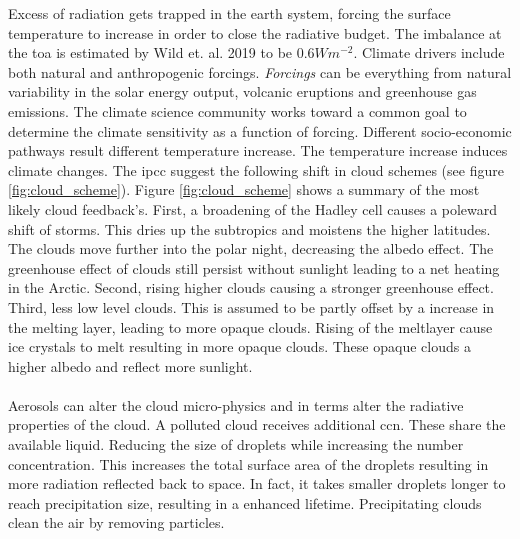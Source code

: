 Excess of radiation gets trapped in the earth system, forcing the surface temperature to increase in order to close the radiative budget. The imbalance at the \acrfull{toa} is estimated by Wild et. al. 2019 to be $0.6W m^{-2}$. 
Climate drivers include both natural and anthropogenic forcings. \textit{Forcings} can be everything from natural variability in the solar energy output, volcanic eruptions and greenhouse gas emissions. The climate science community works toward a common goal to determine the climate sensitivity as a function of forcing. Different socio-economic pathways result different temperature increase. The temperature increase induces climate changes. The \acrfull{ipcc} suggest the following shift in cloud schemes (see figure \ref{fig:cloud_scheme}). Figure \ref{fig:cloud_scheme} shows a summary of the most likely cloud feedback's. First, a broadening of the Hadley cell causes a poleward shift of storms. This dries up the subtropics %
and moistens the higher latitudes. The clouds move further into the polar night, decreasing the albedo effect. The greenhouse effect of clouds still persist without sunlight leading to a net heating in the Arctic. Second, rising higher clouds causing a stronger greenhouse effect. Third, less low level clouds. This is assumed to be partly offset by a increase in the melting layer, leading to more opaque clouds. Rising of the meltlayer cause ice crystals to melt resulting in more opaque clouds. These opaque clouds a higher albedo and reflect more sunlight. 
\\ \\
Aerosols can alter the cloud micro-physics and in terms alter the radiative properties of the cloud. A polluted cloud receives additional \acrshort{ccn}. These share the available liquid. Reducing the size of droplets while increasing the number concentration. This increases the total surface area of the droplets resulting in more radiation reflected back to space. In fact, it takes smaller droplets longer to reach precipitation size, resulting in a enhanced lifetime. Precipitating clouds clean the air by removing particles. 
